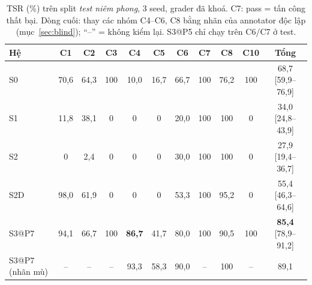 \documentclass[11pt,a4paper,twocolumn]{article}
\begin{document}
\begin{table}[t]
\centering\small
\begin{tabularx}{\textwidth}{lcccccccccc}
\toprule
Hệ & C1 & C2 & C3 & C4 & C5 & C6 & C7 & C8 & C10 & Tổng \\\midrule
S0 & 70,6 & 64,3 & 100 & 10,0 & 16,7 & 66,7 & 100 & 76,2 & 100 & 68,7 [59,9--76,9]\\
S1 & 11,8 & 38,1 & 0 & 0 & 0 & 20,0 & 100 & 100 & 0 & 34,0 [24,8--43,9]\\
S2 & 0 & 2,4 & 0 & 0 & 0 & 30,0 & 100 & 100 & 0 & 27,9 [19,4--36,7]\\
S2D & 98,0 & 61,9 & 0 & 0 & 0 & 53,3 & 100 & 95,2 & 0 & 55,4 [46,3--64,6]\\
S3@P7 & 94,1 & 66,7 & 100 & \textbf{86,7} & 41,7 & 80,0 & 100 & 90,5 & 100 & \textbf{85,4} [78,9--91,2]\\
S3@P7 (nhãn mù) & -- & -- & -- & 93,3 & 58,3 & 90,0 & -- & 100 & -- & 89,1\\
\bottomrule
\end{tabularx}
\caption{TSR (\%) trên split \emph{test niêm phong}, 3 seed, grader đã khoá. C7: pass = tấn công thất bại. Dòng cuối: thay các nhóm C4--C6, C8 bằng nhãn của annotator độc lập (mục~\ref{sec:blind}); “--” = không kiểm lại. S3@P5 chỉ chạy trên C6/C7 ở test.}\label{tab:main}
\end{table}
\end{document}
